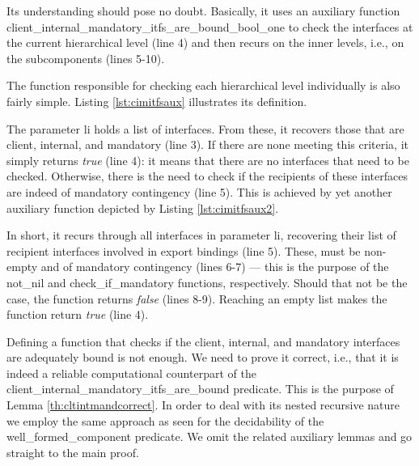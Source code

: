    \noindent %
   Its understanding should pose no doubt. Basically, it uses an auxiliary function
   \textsf{client\_internal\_mandatory\_itfs\_are\_bound\_bool\_one} to check the \textsf{interface}s at the current 
   hierarchical level (line 4) and then recurs on the inner levels, i.e., on the 
   sub\textsf{component}s (lines 5-10).
   
	The function responsible for checking each hierarchical level individually is also fairly simple. Listing
	\ref{lst:cimitfsaux} illustrates its definition.

	


	\noindent  The parameter \textsf{li} holds a list of \textsf{interface}s. From these, it recovers those
	that are \textsf{client}, \textsf{internal}, and \textsf{mandatory} (line 3). If there are none meeting
	this criteria,  it simply returns \textit{true} (line 4): it means that there are no \textsf{interface}s that need
	to be checked. Otherwise, there is the need to check if the recipients of these \textsf{interface}s are indeed
	of \textsf{mandatory} contingency (line 5). This is achieved by yet another auxiliary function depicted by
	Listing \ref{lst:cimitfsaux2}.
	
	

	\noindent In short, it recurs through all \textsf{interface}s in parameter \textsf{li}, recovering
	their list of recipient \textsf{interface}s involved in \textsf{export} \textsf{binding}s (line 5). 
	These, must be non-empty and of \textsf{mandatory} \textsf{contingency} (lines 6-7) ---
	this is the purpose of the \textsf{not\_nil} and \textsf{check\_if\_mandatory} functions, respectively.
	Should that
	not be the case, the function returns \textit{false} (lines 8-9). Reaching an empty list makes the function
	return \textit{true} (line 4).
				
	
	Defining a function that checks if the \textsf{client}, \textsf{internal}, and \textsf{mandatory}
	\textsf{interface}s are adequately bound is not enough. We need to prove it correct, i.e., that it is
	indeed a reliable computational counterpart of the \textsf{client\_internal\_mandatory\_itfs\_are\_bound} 
	predicate. This is the purpose of Lemma	\ref{th:cltintmandcorrect}. In order to deal with its nested recursive
	nature we employ the same approach as seen for the decidability of the \textsf{well\_formed\_component} predicate.
	We omit the related auxiliary lemmas	and go straight to the main proof.		
	
